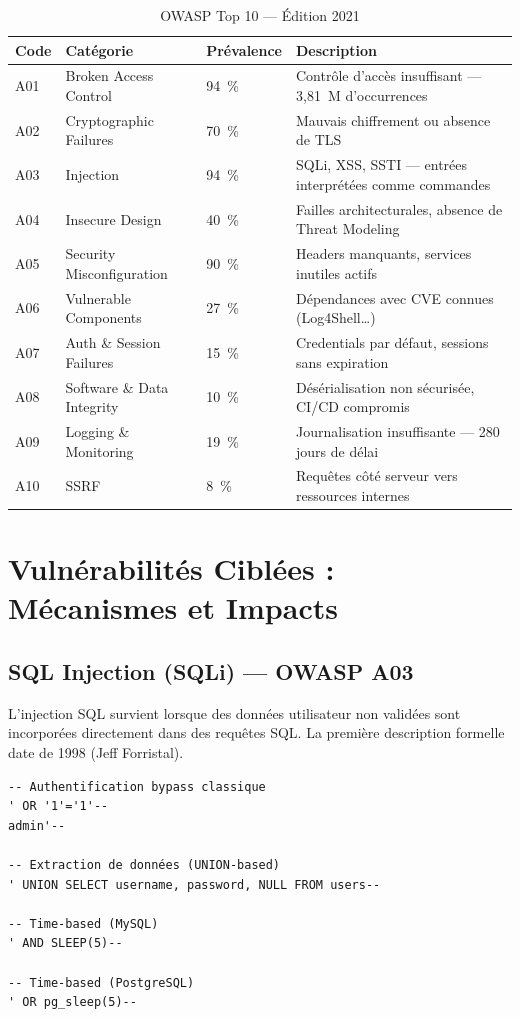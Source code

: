 \documentclass[12pt,a4paper]{report}
\newcommand{\hdr}[1]{\cellcolor{gray!15}\textbf{#1}}
\newcommand{\rowA}{\rowcolor{gray!8}}
\begin{document}
\begin{table}[h!]
\centering
\caption{OWASP Top 10 — Édition 2021}
\begin{tabular}{p{1.2cm}p{4cm}p{1.5cm}p{5.5cm}}
\toprule
\hdr{Code} & \hdr{Catégorie} & \hdr{Prévalence} & \hdr{Description} \\
\midrule
\rowA A01 & Broken Access Control & 94~\% & Contrôle d'accès insuffisant — 3,81~M d'occurrences \\
A02 & Cryptographic Failures & 70~\% & Mauvais chiffrement ou absence de TLS \\
\rowA A03 & Injection & 94~\% & SQLi, XSS, SSTI — entrées interprétées comme commandes \\
A04 & Insecure Design & 40~\% & Failles architecturales, absence de Threat Modeling \\
\rowA A05 & Security Misconfiguration & 90~\% & Headers manquants, services inutiles actifs \\
A06 & Vulnerable Components & 27~\% & Dépendances avec CVE connues (Log4Shell\ldots) \\
\rowA A07 & Auth \& Session Failures & 15~\% & Credentials par défaut, sessions sans expiration \\
A08 & Software \& Data Integrity & 10~\% & Désérialisation non sécurisée, CI/CD compromis \\
\rowA A09 & Logging \& Monitoring & 19~\% & Journalisation insuffisante — 280 jours de délai \\
A10 & SSRF & 8~\% & Requêtes côté serveur vers ressources internes \\
\bottomrule
\end{tabular}
\end{table}

\section{Vulnérabilités Ciblées : Mécanismes et Impacts}

\subsection{SQL Injection (SQLi) — OWASP A03}

L'injection SQL survient lorsque des données utilisateur non validées sont incorporées directement
dans des requêtes SQL. La première description formelle date de 1998 (Jeff Forristal).

\begin{lstlisting}[style=bash, caption={Exemples de payloads SQL Injection}]
-- Authentification bypass classique
' OR '1'='1'--
admin'--

-- Extraction de données (UNION-based)
' UNION SELECT username, password, NULL FROM users--

-- Time-based (MySQL)
' AND SLEEP(5)--

-- Time-based (PostgreSQL)
' OR pg_sleep(5)--
\end{lstlisting}
\end{document}
